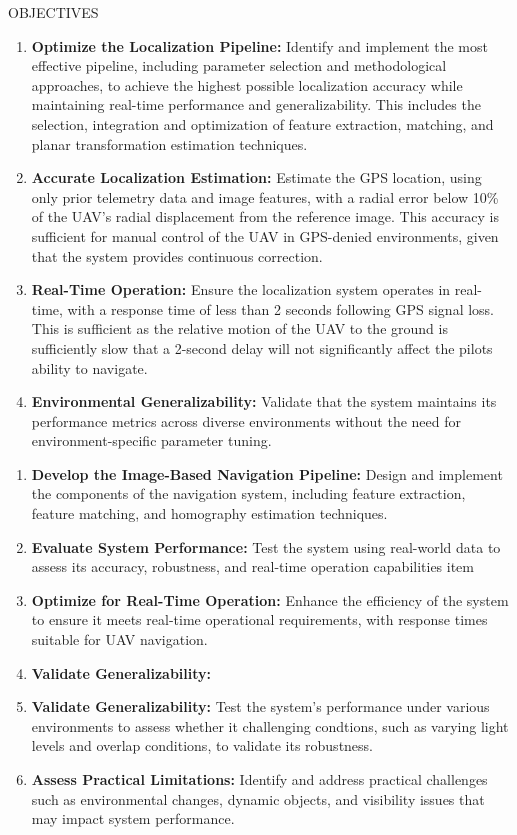OBJECTIVES
\begin{enumerate}
    \item \textbf{Optimize the Localization Pipeline:} Identify and implement the most effective pipeline, including parameter selection and methodological approaches, to achieve the highest possible localization accuracy while maintaining real-time performance and generalizability. This includes the selection, integration and optimization of feature extraction, matching, and planar transformation estimation techniques.
    \item \textbf{Accurate Localization Estimation:} Estimate the GPS location, using only prior telemetry data and image features, with a radial error below 10\% of the UAV's radial displacement from the reference image. This accuracy is sufficient for manual control of the UAV in GPS-denied environments, given that the system provides continuous correction.
    \item \textbf{Real-Time Operation:} Ensure the localization system operates in real-time, with a response time of less than 2 seconds following GPS signal loss. This is sufficient as the relative motion of the UAV to the ground is sufficiently slow that a 2-second delay will not significantly affect the pilots ability to navigate.
    \item \textbf{Environmental Generalizability:} Validate that the system maintains its performance metrics across diverse environments without the need for environment-specific parameter tuning.
\end{enumerate}


\begin{enumerate} 
\item \textbf{Develop the Image-Based Navigation Pipeline:} Design and implement the components of the navigation system, including feature extraction, feature matching, and homography estimation techniques. 
\item \textbf{Evaluate System Performance:} Test the system using real-world data to assess its accuracy, robustness, and real-time operation capabilities 
item \textbf{}


\item \textbf{Optimize for Real-Time Operation:} Enhance the efficiency of the system to ensure it meets real-time operational requirements, with response times suitable for UAV navigation. 
\item \textbf{Validate Generalizability:} \item \textbf{Validate Generalizability:} Test the system's performance under various environments to assess whether it challenging condtions, such as varying light levels and overlap conditions, to validate its robustness.
\item \textbf{Assess Practical Limitations:} Identify and address practical challenges such as environmental changes, dynamic objects, and visibility issues that may impact system performance. 
\end{enumerate}


